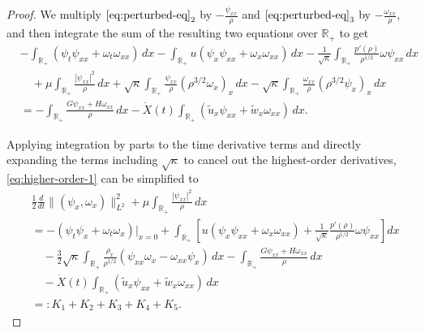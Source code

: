 \documentclass[10pt,a4paper]{amsart}
\begin{document}
\begin{proof} We multiply $\eqref{eq:perturbed-eq}_2$ by $-\frac{\psi_{xx}}{\rho}$ and $\eqref{eq:perturbed-eq}_3$ by $-\frac{\omega_{xx}}{\rho}$, and then integrate the sum of the resulting two equations over $\mathbb{R}_+$ to get
\begin{equation}\label{eq:higher-order-1}
\begin{aligned}
    &-\int_{\mathbb{R}_+} (\psi_t \psi_{xx} + \omega_t \omega_{xx}) \,dx - \int_{\mathbb{R}_+} u (\psi_x \psi_{xx} + \omega_x \omega_{xx}) \,dx - \frac{1}{\sqrt{\kappa}}\int_{\mathbb{R}_+} \frac{p'(\rho)}{\rho^{1/2}} \omega \psi_{xx} \,dx \\
    &\quad + \mu \int_{\mathbb{R}_+} \frac{|\psi_{xx}|^2}{\rho}  \,dx + \sqrt{\kappa} \int_{\mathbb{R}_+} \frac{\psi_{xx}}{\rho} (\rho^{3/2} \omega_x)_x \,dx - \sqrt{\kappa} \int_{\mathbb{R}_+} \frac{\omega_{xx}}{\rho} (\rho^{3/2} \psi_x)_x \,dx \\
    &=- \int_{\mathbb{R}_+} \frac{G\psi_{xx} + H\omega_{xx}}{\rho} \,dx  - \dot{X}(t) \int_{\mathbb{R}_+} (\tilde{u}_x \psi_{xx} + \tilde{w}_x \omega_{xx}) \,dx.
\end{aligned}
\end{equation}

Applying integration by parts to the time derivative terms and directly expanding the terms including $\sqrt{\kappa}$ to cancel out the highest-order derivatives, \eqref{eq:higher-order-1} can be simplified to
\begin{equation*}%
\begin{aligned}
    &\frac{1}{2} \frac{d}{dt} \|(\psi_x, \omega_x)\|_{L^2}^2 + \mu \int_{\mathbb{R}_+} \frac{|\psi_{xx}|^2}{\rho}  \,dx \\
    &= -(\psi_t \psi_x + \omega_t \omega_x)|_{x=0}   + \int_{\mathbb{R}_+} \left[u (\psi_x \psi_{xx} + \omega_x \omega_{xx}) +\frac{1}{\sqrt{\kappa}}\frac{p'(\rho)}{\rho^{1/2}} \omega \psi_{xx} \right] dx \\
    &\quad - \frac{3}{2}\sqrt{\kappa} \int_{\mathbb{R}_+} \frac{\rho_x}{\rho^{1/2}} (\psi_{xx} \omega_x - \omega_{xx} \psi_x) \,dx - \int_{\mathbb{R}_+} \frac{G\psi_{xx} + H\omega_{xx}}{\rho} \,dx \\
    &\quad - \dot{X}(t) \int_{\mathbb{R}_+} (\tilde{u}_x \psi_{xx} + \tilde{w}_x \omega_{xx}) \,dx \\
    &=: K_1 + K_2 + K_3 + K_4 + K_5.
\end{aligned}
\end{equation*}


\end{proof}
\end{document}
